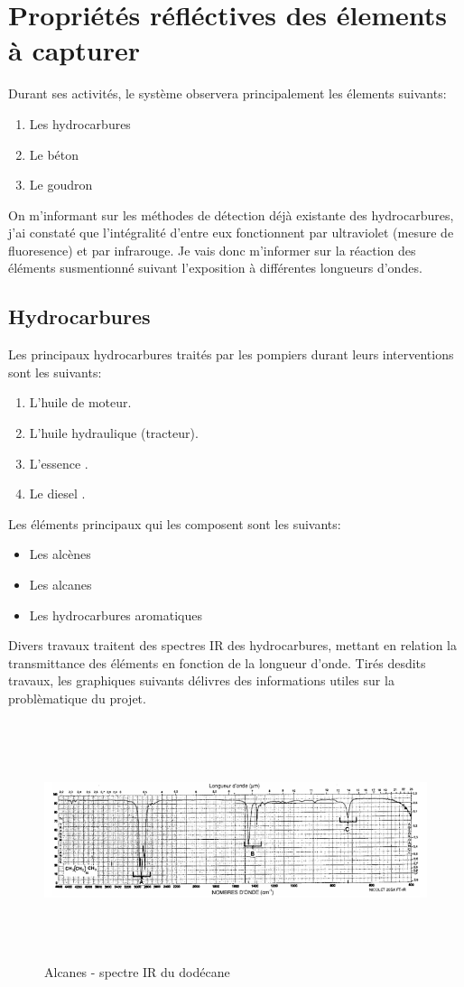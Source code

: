 \section{Propriétés réfléctives des élements à capturer}
Durant ses activités, le système observera principalement les élements suivants:
\begin{enumerate}
    \item Les hydrocarbures
    \item Le béton
    \item Le goudron
\end{enumerate}
On m'informant sur les méthodes de détection déjà existante des hydrocarbures, j'ai constaté que l'intégralité d'entre eux fonctionnent
par ultraviolet (mesure de fluoresence) et par infrarouge. Je vais donc m'informer sur la réaction des éléments susmentionné suivant l'exposition à différentes longueurs d'ondes.
\subsection{Hydrocarbures}
Les principaux hydrocarbures traités par les pompiers durant leurs interventions sont les suivants:
\begin{enumerate}
    \item L'huile de moteur.
    \item L'huile hydraulique (tracteur).
    \item L'essence \cite{TotalEnergies}.
    \item Le diesel \cite{TotalEnergies}.
\end{enumerate}
Les éléments principaux qui les composent sont les suivants:
\begin{itemize}
    \item Les alcènes
    \item Les alcanes
    \item Les hydrocarbures aromatiques
\end{itemize}
Divers travaux \cite{Hydrocarbures} traitent des spectres IR des hydrocarbures, mettant en relation la transmittance des éléments en fonction de la longueur d'onde.
Tirés desdits travaux, les graphiques suivants délivres des informations utiles sur la problèmatique du projet.

\begin{figure}[H]
    \centering
    \includegraphics[height=7cm,angle=90]{assets/figures/alcanes1.png}
    \caption{Alcanes - spectre IR du dodécane \cite{Hydrocarbures}}
\end{figure}

